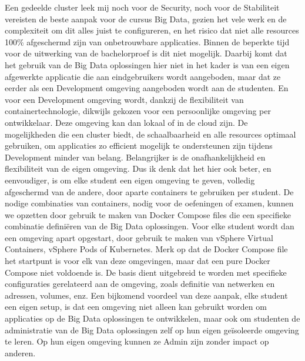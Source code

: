 Een gedeelde cluster leek mij noch voor de Security, noch voor de Stabiliteit vereisten de beste aanpak voor de cursus Big Data, gezien het vele werk en de complexiteit om dit alles juist te configureren, en het risico dat niet alle resources 100\% afgeschermd zijn van onbetrouwbare applicaties. Binnen de beperkte tijd voor de uitwerking van de bachelorproef is dit niet mogelijk.
\newline
\newline
Daarbij komt dat het gebruik van de Big Data oplossingen hier niet in het kader is van een eigen afgewerkte applicatie die aan eindgebruikers wordt aangeboden, maar dat ze eerder als een Development omgeving aangeboden wordt aan de studenten. En voor een Development omgeving wordt, dankzij de flexibiliteit van containertechnologie, dikwijls gekozen voor een persoonlijke omgeving per ontwikkelaar. Deze omgeving kan dan lokaal of in de cloud zijn.
\newline
\newline
De mogelijkheden die een cluster biedt, de schaalbaarheid en alle resources optimaal gebruiken, om applicaties zo efficient mogelijk te ondersteunen zijn tijdens Development minder van belang. Belangrijker is de onafhankelijkheid en flexibiliteit van de eigen omgeving.
Dus ik denk dat het hier ook beter, en eenvoudiger, is om elke student een eigen omgeving te geven, volledig afgeschermd van de andere, door aparte containers te gebruiken per student.
\newline
\newline
De nodige combinaties van containers, nodig voor de oefeningen of examen, kunnen we opzetten door gebruik te maken van Docker Compose files die een specifieke combinatie definiëren van de Big Data oplossingen. Voor elke student wordt dan een omgeving apart opgestart, door gebruik te maken van vSphere Virtual Containers, vSphere Pods of Kubernetes. Merk op dat de Docker Compose file het startpunt is voor elk van deze omgevingen, maar dat een pure Docker Compose niet voldoende is. De basis dient uitgebreid te worden met specifieke configuraties gerelateerd aan de omgeving, zoals definitie van netwerken en adressen, volumes, enz.
\newline
\newline
Een bijkomend voordeel van deze aanpak, elke student een eigen setup, is dat een omgeving niet alleen kan gebruikt worden om applicaties op de Big Data oplossingen te ontwikkelen, maar ook om studenten de administratie van de Big Data oplossingen zelf op hun eigen geïsoleerde omgeving te leren. Op hun eigen omgeving kunnen ze Admin zijn zonder impact op anderen.

